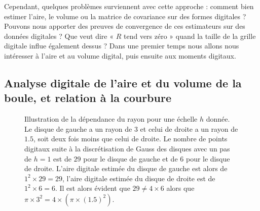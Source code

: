 Cependant, quelques problèmes surviennent avec cette approche : comment bien
estimer l'aire, le volume ou la matrice de covariance sur des formes digitales ?
Pouvons nous apporter des preuves de convergence de ces estimateurs sur des
données digitales ? Que veut dire « $R$ tend vers zéro » quand la taille de la
grille digitale influe également dessus ? Dans une premier temps nous allons
nous intéresser à l'aire et au volume digital, puis ensuite aux moments
digitaux.

\subsection{Analyse digitale de l'aire et du volume de la boule, et relation à la courbure}
\label{sec:ii-2d}

\begin{figure}[ht]
  \begin{center}
    
  \end{center}
  \caption
  {Illustration de la dépendance du rayon pour une échelle $h$ donnée. Le disque de gauche
  a un rayon de $3$ et celui de droite a un rayon de $1.5$, soit deux fois moins
  que celui de droite. Le nombre de points digitaux suite à la discrétisation de
  Gauss des disques avec un pas de $h=1$ est de $29$ pour le disque de gauche et
  de $6$ pour le disque de droite. L'aire digitale estimée du disque de gauche
  est alors de $1^2 \times 29 = 29$, l'aire digitale estimée du disque de droite
  est de $1^2 \times 6 = 6$. Il est alors évident que $29 \ne 4 \times
  6$ alors que $\pi \times 3^2 = 4 \times (\pi \times (1.5)^2)$.\label{fig:2d-area-2}}
\end{figure}

